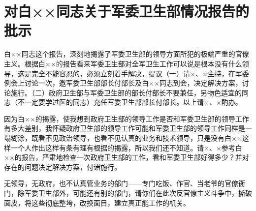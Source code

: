\section[对白××同志关于军委卫生部情况报告的批示（一九五三年四月三日）]{对白××同志关于军委卫生部情况报告的批示}


白××同志这个报告，深刻地揭露了军委卫生部的领导方面所犯的极端严重的官僚主义。根据白××的报告看来军委卫生部对全军卫生工作可以说是根本没有什么领导，这是完全不能容忍的，必须立刻着手解决，提议（一）请×、×主持，在军委例会上讨论一次，邀军委卫生部部长付部长及白××同志到会，决定解决方案，讨论施行。（二）政府卫生部与军委卫生部的部长付部长不要兼任，另物色适宜的同志（不一定要学过医的同志）充任军委卫生部部长付部长。以上请×、×酌办。

因为白××的揭露，使我想到政府卫生部的领导工作是否和军委卫生部的领导工作有多大差别，我怀疑政府卫生部的领导工作可能和军委卫生部的领导工作同样是一塌糊涂，既看不见政治领导，也看不见认真的业务和技术领导，只是没有白××这样一个人作出这样有条有理有根据的揭露，所以我们还不知道。请×、×参考白××的报告，严肃地检查一次政府卫生部的工作，看和军委卫生部好得多少？并对存在的问题决定解决方案，付诸施行。

无领导，无政府，也不认真管业务的部门——专门吃饭、作官、当老爷的官僚衙门，除军委卫生部外，可能还有别的部门，请你们在此次反官僚主义斗争中，撕破面皮，将这些彻底整垮，改换面目，建立真正能工作的机关。


